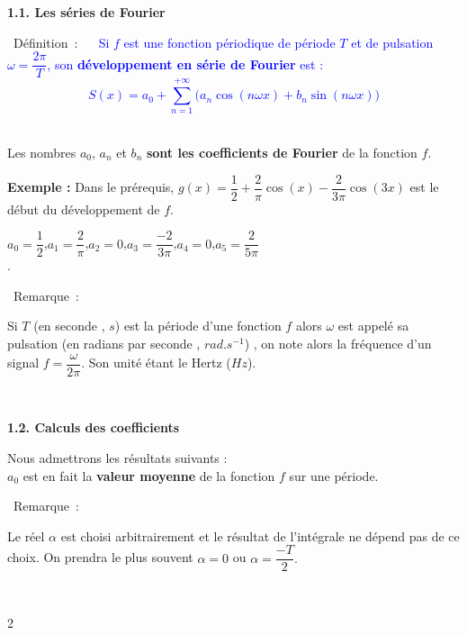 \documentclass[11pt,a4paper]{article}
\newcommand{\cor}[1]{%
  \begin{tcolorbox}[
    colback=blue!5!white,
    colframe=blue!70!black,
    boxrule=1pt,
    arc=3pt,
    left=4pt, right=4pt, top=3pt, bottom=3pt,
    before skip=2mm, after skip=3mm
  ]
  \color{blue!80!black}#1
  \end{tcolorbox}%
}
\newcommand{\bdef}[1]
{\begin{bclogo}[couleur = white,logo=\bcinfo , arrondi = 0.1]
{~Définition~:}
~~
{#1}
~~
\end{bclogo}}
\newcommand{\rem}[1]
{\begin{bclogo}[couleur = white,logo=\bcinfo , arrondi = 0.1]
{~Remarque~:}
~~
{#1}
~~
\end{bclogo}}
\begin{document}
\begin{mybox}
    \textbf{1.1. Les séries de Fourier}
\end{mybox}

\bdef{
\textcolor{blue}{Si $f$ est une fonction périodique de période $T$ et de pulsation $\omega=\dfrac{2\pi}{T}$, son \textbf{développement en série de Fourier} est :
\[S(x) = a_0 + \sum_{n=1}^{+\infty}\bigl(a_n\cos(n\omega x) + b_n\sin(n\omega x)\bigr)\]}
}

Les nombres $a_0$, $a_n$ et $b_n$ \textbf{sont les coefficients de Fourier} de la fonction $f$.

\vfill 


\textbf{Exemple :} Dans le prérequis, $g(x)=\dfrac{1}{2}+\dfrac{2}{\pi}\cos(x)-\dfrac{2}{3\pi}\cos(3x)$ est le début du développement de $f$.

\cor{
$a_0=\dfrac{1}{2}$,\quad $a_1=\dfrac{2}{\pi}$,\quad $a_2=0$,\quad $a_3=\dfrac{-2}{3\pi}$,\quad $a_4=0$,\quad $a_5=\dfrac{2}{5\pi}$\\[2mm]
.
}

\vfill 

\rem{ Si $T$ (en seconde , $s$) est la période d'une fonction $f$ alors $\omega$ est appelé sa pulsation (en radians par seconde , $rad.s^{-1}$) , on note alors la fréquence d'un signal $f=\dfrac{\omega}{2\pi}$. Son unité étant le Hertz ($Hz$).

}

\vfill 

\begin{mybox}
    \textbf{1.2. Calculs des coefficients}
\end{mybox}

Nous admettrons les résultats suivants : \\[3mm]
$a_0$ est en fait la \textbf{valeur moyenne} de la fonction $f$ sur une période.
\vspace{3mm}

\rem{Le réel $\alpha$ est choisi arbitrairement et le résultat de l'intégrale ne dépend pas de ce choix. On prendra le plus souvent $\alpha = 0$ ou $\alpha = \dfrac{-T}{2}.$

}

\vspace{0.3cm}

\begin{multicols}{2}
\begin{center}
 \\
 \\
\end{center}\end{multicols}
\end{document}
